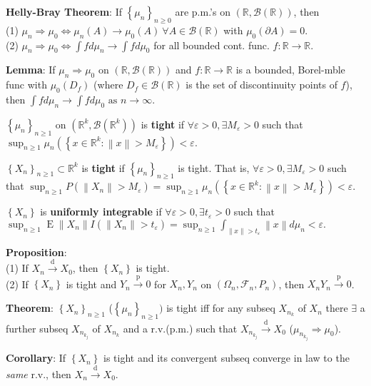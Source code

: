 \documentclass[paper=letter,fontsize=2.89mm]{scrartcl}
\DeclareMathOperator{\E}{E}
\newcommand{\convdist}{\stackrel{\text{d}}{\longrightarrow}}
\newcommand{\convprob}{\stackrel{\text{p}}{\longrightarrow}}
\newcommand{\Borel}{\mathcal{B}}
\newcommand{\eps}{\varepsilon}
\newcommand{\R}{\mathbb{R}}
\newcommand\norm[1]{\left\lVert #1 \right\rVert}
\newcommand\set[1]{\left\{ #1 \right\}}
\begin{document}
\begin{multicols*}{3}
\textbf{Helly-Bray Theorem}: If $\set{\mu_n}_{ n\ge0}$ are p.m.'s on $(\R, \Borel(\R))$, then  \\
(1) $\mu_n \Rightarrow \mu_0 \iff \mu_n(A) \to \mu_0(A) ~\forall A \in \Borel(\R)$ with $\mu_0(\partial A) = 0.$ \\
(2) $\mu_n \Rightarrow \mu_0 \iff \int fd\mu_n \to \int f d\mu_0$ for all bounded cont. func. $f: \R \to \R$. \\ \medskip

\textbf{Lemma}: If $\mu_n \Rightarrow \mu_0$ on $(\R, \Borel(\R))$ and $f: \R \to \R$ is a bounded, Borel-mble func with $\mu_0(D_f)$ (where $D_f \in \Borel(\R)$ is the set of discontinuity points of $f$), then $\int fd\mu_n \to \int f d\mu_0 \text{ as } n \to \infty.$ \\ \medskip

$\set{\mu_n}_{n\ge1}$ on $(\R^k, \Borel(\R^k))$ is \textbf{tight} if $\forall \eps >0, \exists M_\eps > 0 $ such that
$\sup_{n\ge1} \mu_n\left(\set{x\in\R^k: \norm{x} > M_\eps}\right) < \eps.$ \\ \medskip

$\set{X_n}_{n\ge1} \subset \R^k$ is \textbf{tight} if $\set{\mu_n}_{n\ge1}$ is tight. That is, $\forall \eps > 0, \exists M_\eps > 0$ such that
$\sup_{n\ge1}P(\norm{X_n} > M_\eps) = \sup_{n\ge1}\mu_n\left(\set{x \in \R^k: \norm{x} > M_\eps }\right) < \eps$. \\ \medskip

$\set{X_n}$ is \textbf{uniformly integrable} if $\forall \eps > 0, \exists t_\eps > 0$ such that
$\sup_{n\ge1}\E \norm{X_n} I(\norm{X_n} > t_\eps) = \sup_{n\ge1}\int_{\norm{x} > t_\eps} \norm{x} d\mu_n < \eps.$ \\ \medskip

\textbf{Proposition}: \\
(1) If $X_n \convdist X_0$, then $\set{X_n}$ is tight. \\
(2) If $\set{X_n}$ is tight and $Y_n \convprob 0$ for $X_n, Y_n$ on $(\Omega_n, \mathcal{F}_n, P_n)$, then $X_nY_n \convprob 0$. \\ \medskip

\textbf{Theorem}: $\set{X_n}_{n\ge1}$ ($\set{\mu_n}_{n\ge1})$ is tight iff for any subseq $X_{n_k}$ of $X_n$ there $\exists$ a further subseq $X_{n_{k_j}}$ of $X_{n_k}$ and a r.v.\@ (p.m.\@) such that $X_{n_{k_j}} \convdist X_0$ ($\mu_{n_{k_j}} \Rightarrow \mu_0$).  \\ \medskip

\textbf{Corollary}: If $\set{X_n}$ is tight and its convergent subseq converge in law to the \emph{same} r.v.\@, then $X_n \convdist X_0$.  \\ \medskip


\end{multicols*}
\end{document}
